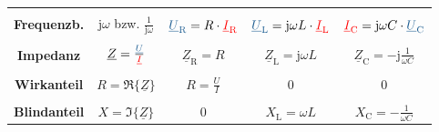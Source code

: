 \begin{frame}
\begin{table}[h]
{\begin{tabular}{ |c|c|c|c|c| }
        \hline &&&&\\[-6pt]
        \textbf{Frequenzb.}
                & $ \mathrm{j}\omega $ bzw. $ \frac{1}{\mathrm{j}\omega} $
                & $ \ecv{\underline{U}_{\mathrm R}} = R                   \cdot \eci{\underline{I}_{\mathrm R}} $ 
                & $ \ecv{\underline{U}_{\mathrm L}} = \mathrm{j}\omega L  \cdot \eci{\underline{I}_{\mathrm L}} $
                & $ \eci{\underline{I}_{\mathrm C}} = \mathrm{j}\omega C  \cdot \ecv{\underline{U}_{\mathrm C}} $ \\[+4pt]
        \hline &&&&\\[-6pt]
        \textbf{Impedanz}
                & $ \underline{Z} = \frac{\ecv{\underline{U}}}{\eci{\underline{I}}} $
                & $ \underline{Z}_{\mathrm R} = R $ 
                & $ \underline{Z}_{\mathrm L} = \mathrm{j}\omega L $
                & $ \underline{Z}_{\mathrm C} = -\mathrm{j}\frac{1}{\omega C} $ \\[+4pt]
        \hline &&&&\\[-6pt]
        \textbf{Wirkanteil}
                & $ R = \Re\{\underline{Z}\} $
                & $ R = \frac{U}{I} $
                & $ 0 $
                & $ 0 $ \\[+4pt]
                \hline &&&&\\[-6pt]
        \textbf{Blindanteil}
                & $ X = \Im\{\underline{Z}\} $
                & $ 0 $
                & $ X_{\mathrm L} = \omega L $
                & $ X_{\mathrm C} = -\frac{1}{\omega C}$ \\[+4pt]
        \hline
    \end{tabular}
    } %
    \end{table}
    
\end{frame}


